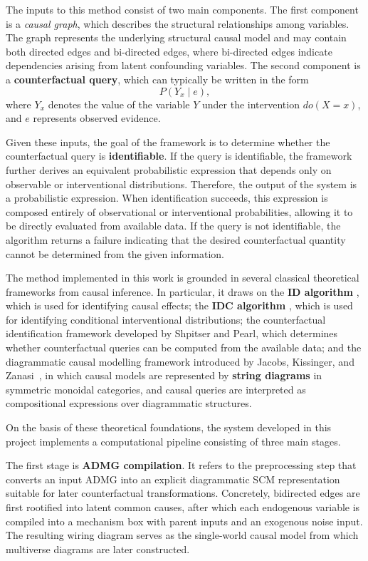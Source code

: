 \documentclass[a4paper]{report}
\begin{document}
The inputs to this method consist of two main components. The first component is a \textit{causal graph}, which describes the structural relationships among variables. The graph represents the underlying structural causal model and may contain both directed edges and bi-directed edges, where bi-directed edges indicate dependencies arising from latent confounding variables. The second component is a \textbf{counterfactual query}, which can typically be written in the form
\[
P(Y_x \mid e),
\]
where $Y_x$ denotes the value of the variable $Y$ under the intervention $do(X=x)$, and $e$ represents observed evidence.

Given these inputs, the goal of the framework is to determine whether the counterfactual query is \textbf{identifiable}. 
If the query is identifiable, the framework further derives an equivalent probabilistic expression that depends only on observable or interventional distributions. Therefore, the output of the system is a probabilistic expression. When identification succeeds, this expression is composed entirely of observational or interventional probabilities, allowing it to be directly evaluated from available data. If the query is not identifiable, the algorithm returns a failure indicating that the desired counterfactual quantity cannot be determined from the given information.

The method implemented in this work is grounded in several classical theoretical frameworks from causal inference. 
In particular, it draws on the \textbf{ID algorithm} \cite{shpitser2006identification}, which is used for identifying causal effects; the \textbf{IDC algorithm} \cite{shpitser2008complete}, which is used for identifying conditional interventional distributions; the counterfactual identification framework developed by Shpitser and Pearl, which determines whether counterfactual queries can be computed from the available data; and the diagrammatic causal modelling framework introduced by Jacobs, Kissinger, and Zanasi~\cite{jacobs2019causal,jacobs2021causal}, in which causal models are represented by \textbf{string diagrams} in symmetric monoidal categories, and causal queries are interpreted as compositional expressions over diagrammatic structures.

On the basis of these theoretical foundations, the system developed in this project implements a computational pipeline consisting of three main stages.

The first stage is \textbf{ADMG compilation}. 
It refers to the preprocessing step that converts an input ADMG into an explicit diagrammatic SCM representation suitable for later counterfactual transformations. Concretely, bidirected edges are first rootified into latent common causes, after which each endogenous variable is compiled into a mechanism box with parent inputs and an exogenous noise input. The resulting wiring diagram serves as the single-world causal model from which multiverse diagrams are later constructed.
\end{document}
